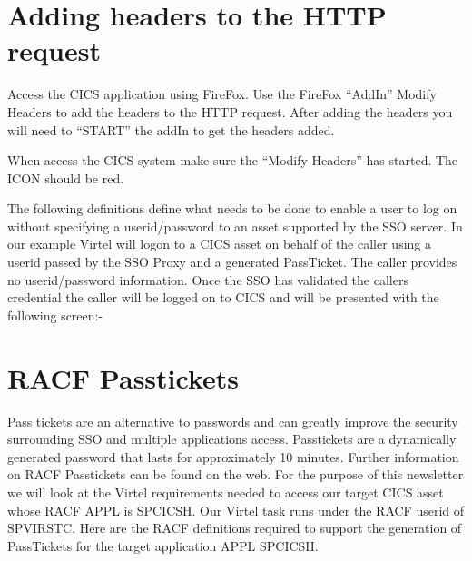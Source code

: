 \documentclass[letterpaper,10pt,english]{sphinxmanual}
\begin{document}
\newpage


\section{Adding headers to the HTTP request}
\label{\detokenize{connectivity_guide:index-164}}\label{\detokenize{connectivity_guide:adding-headers-to-the-http-request}}
Access the CICS application using FireFox. Use the FireFox “AddIn” Modify Headers to add the headers to the HTTP request. After adding the headers you will need to “START” the addIn to get the headers added.

 

When access the CICS system make sure the “Modify Headers” has started. The ICON should be red.



The following definitions define what needs to be done to enable a user to log on without specifying a userid/password to an asset supported by the SSO server. In our example Virtel will logon to a CICS asset on behalf of the caller using a userid passed by the SSO Proxy and a generated PassTicket. The caller provides no userid/password information. Once the SSO has validated the callers credential the caller will be logged on to CICS and will be presented with the following screen:-

 

\newpage


\section{RACF Passtickets}
\label{\detokenize{connectivity_guide:racf-passtickets}}\label{\detokenize{connectivity_guide:index-165}}
Pass tickets are an alternative to passwords and can greatly improve the security surrounding SSO and multiple applications access. Passtickets are a dynamically generated password that lasts for approximately 10 minutes. Further information on RACF Passtickets can be found on the web. For the purpose of this newsletter we will look at the Virtel requirements needed to access our target CICS asset whose RACF APPL is SPCICSH. Our Virtel task runs under the RACF userid of SPVIRSTC. Here are the RACF definitions required to support the generation of PassTickets for the target application APPL SPCICSH.
\end{document}
